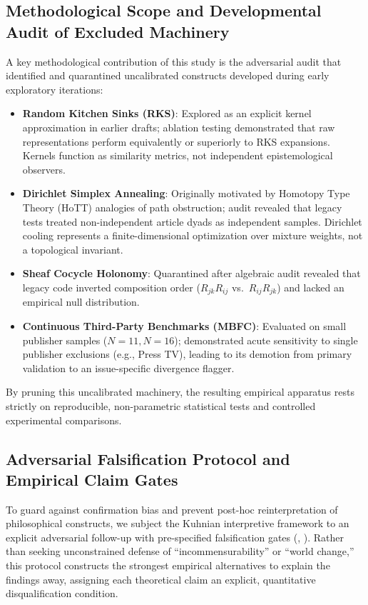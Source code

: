 \subsection{Methodological Scope and Developmental Audit of Excluded Machinery}
\label{sec:meth_excluded}

A key methodological contribution of this study is the adversarial audit that identified and quarantined uncalibrated constructs developed during early exploratory iterations:
\begin{itemize}
    \item \textbf{Random Kitchen Sinks (RKS)}: Explored as an explicit kernel approximation in earlier drafts; ablation testing demonstrated that raw representations perform equivalently or superiorly to RKS expansions. Kernels function as similarity metrics, not independent epistemological observers.
    \item \textbf{Dirichlet Simplex Annealing}: Originally motivated by Homotopy Type Theory (HoTT) analogies of path obstruction; audit revealed that legacy tests treated non-independent article dyads as independent samples. Dirichlet cooling represents a finite-dimensional optimization over mixture weights, not a topological invariant.
    \item \textbf{Sheaf Cocycle Holonomy}: Quarantined after algebraic audit revealed that legacy code inverted composition order ($R_{jk}R_{ij}$ vs.\ $R_{ij}R_{jk}$) and lacked an empirical null distribution.
    \item \textbf{Continuous Third-Party Benchmarks (MBFC)}: Evaluated on small publisher samples ($N=11, N=16$); demonstrated acute sensitivity to single publisher exclusions (e.g., Press TV), leading to its demotion from primary validation to an issue-specific divergence flagger.
\end{itemize}
By pruning this uncalibrated machinery, the resulting empirical apparatus rests strictly on reproducible, non-parametric statistical tests and controlled experimental comparisons.

\subsection{Adversarial Falsification Protocol and Empirical Claim Gates}
\label{sec:meth_claim_gates}

To guard against confirmation bias and prevent post-hoc reinterpretation of philosophical constructs, we subject the Kuhnian interpretive framework to an explicit adversarial follow-up with pre-specified falsification gates (, ). Rather than seeking unconstrained defense of ``incommensurability'' or ``world change,'' this protocol constructs the strongest empirical alternatives to explain the findings away, assigning each theoretical claim an explicit, quantitative disqualification condition.

